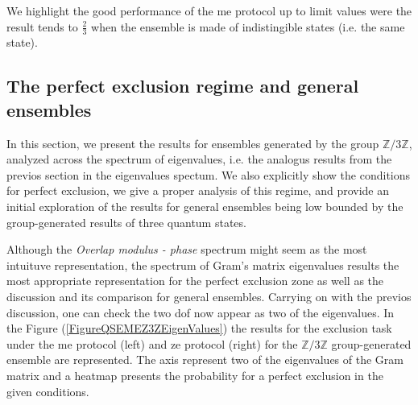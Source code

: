 \documentclass[12pt,letterpaper]{article}
\begin{document}

We highlight the good performance of the \gls{me} protocol up to limit values were the result tends to $\frac{2}{3}$ when the ensemble is made of indistingible states (i.e. the same state). 

\subsection{The perfect exclusion regime and general ensembles}\label{sectionPerfectExclusionRegimeAndGeneralEnsembles}

In this section, we present the results for ensembles generated by the group $\mathbb{Z}/3\mathbb{Z}$, analyzed across the spectrum of eigenvalues, i.e. the analogus results from the previos section in the eigenvalues spectum. We also explicitly show the conditions for perfect exclusion, we give a proper analysis of this regime, and provide an initial exploration of the results for general ensembles being low bounded by the group-generated results of three quantum states.

Although the \emph{Overlap modulus - phase} spectrum might seem as the most intuituve representation, the spectrum of Gram's matrix eigenvalues results the most appropriate representation for the perfect exclusion zone as well as the discussion and its comparison for general ensembles. Carrying on with the previos discussion, one can check the two \gls{dof} now appear as two of the eigenvalues. In the Figure (\ref{FigureQSEMEZ3ZEigenValues}) the results for the exclusion task under the \gls{me} protocol (left) and \gls{ze} protocol (right) for the $\mathbb{Z}/3\mathbb{Z}$ group-generated ensemble are represented. The axis represent two of the eigenvalues of the Gram matrix and a heatmap presents the probability for a perfect exclusion in the given conditions.
\end{document}
